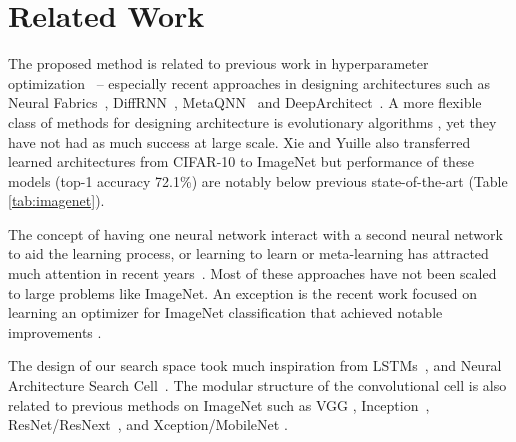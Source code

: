 \section{Related Work}

The proposed method is related to previous work in hyperparameter optimization~\cite{pinto2009high,bergstra2011algorithms,bergstra2012random,snoek2012practical,snoek2015scalable,bergstra2013making,mendoza2016towards} -- especially recent approaches in designing architectures such as Neural Fabrics~\cite{saxena2016convolutional}, DiffRNN~\cite{miconi2016}, MetaQNN~\cite{baker2016designing} and DeepArchitect~\cite{negrinho2017}.  A more flexible class of methods for designing architecture  is evolutionary algorithms \cite{wierstra2005modeling,floreano2008neuroevolution,stanley2009hypercube,jozefowicz2015empirical,real2017large,miikkulainen2017evolving,xie17}, yet they have not had as much success at large scale. 
Xie and Yuille \cite{xie17} also transferred learned architectures from CIFAR-10 to ImageNet but performance of these models (top-1 accuracy 72.1\%) are notably below previous state-of-the-art (Table \ref{tab:imagenet}).

The concept of having one neural network interact with a second neural network to aid the learning process, or learning to learn or meta-learning \cite{hochreiter2001learning,schaul10} has attracted much attention in recent years~\cite{andrychowicz2016learning,wang2016learning,duan2016rl,ha2016hypernetworks,li2017learning,ravi2017optimization,finn2017model}. Most of these approaches have not been scaled to large problems like ImageNet. An exception is the recent work focused on learning an optimizer for ImageNet classification that achieved notable improvements \cite{wichrowska2017learned}.

The design of our search space took much inspiration from LSTMs~\cite{lstm}, and Neural Architecture Search Cell~\cite{zoph2017neural}. The modular structure of the convolutional cell is also related to previous methods on ImageNet such as VGG \cite{simonyan2014very}, Inception~\cite{szegedy2015going,szegedy2016rethinking,szegedy2016inception}, ResNet/ResNext~\cite{he2015deep,xie2016aggregated}, and Xception/MobileNet \cite{chollet2016xception, howard2017mobilenets}.
